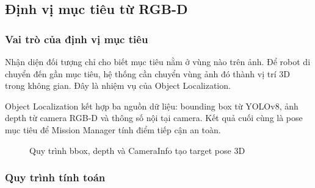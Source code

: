 \subsection{Định vị mục tiêu từ RGB-D}\label{subsec:object-localization}

\subsubsection{Vai trò của định vị mục tiêu}

Nhận diện đối tượng chỉ cho biết mục tiêu nằm ở vùng nào trên ảnh. Để
robot di chuyển đến gần mục tiêu, hệ thống cần chuyển vùng ảnh đó thành
vị trí 3D trong không gian. Đây là nhiệm vụ của Object Localization.

Object Localization kết hợp ba nguồn dữ liệu: bounding box từ YOLOv8,
ảnh depth từ camera RGB-D và thông số nội tại camera. Kết quả cuối cùng
là pose mục tiêu để Mission Manager tính điểm tiếp cận an toàn.

\begin{figure}[H]
\centering
{}
\caption{Quy trình bbox, depth và CameraInfo tạo target pose 3D}
\label{fig:localization-flow}
\end{figure}

\subsubsection{Quy trình tính toán}

